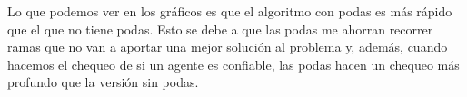 	Lo que podemos ver en los gráficos es que el algoritmo con podas es más rápido que el que no tiene podas. Esto se debe a que las podas me ahorran recorrer ramas que no van a aportar una mejor solución al problema y, además, cuando hacemos el chequeo de si un agente es confiable, las podas hacen un chequeo más profundo que la versión sin podas.   

	